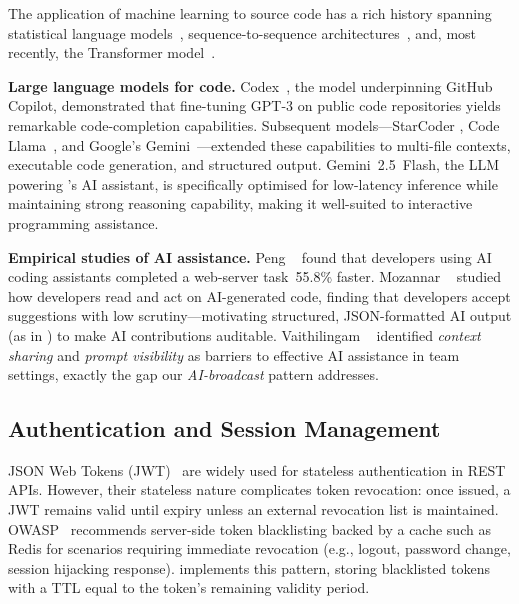 The application of machine learning to source code has a rich history spanning
statistical language models~\cite{hindle2012naturalness}, sequence-to-sequence
architectures~\cite{bahdanau2015neural}, and, most recently, the Transformer
model~\cite{vaswani2017attention}.

\textbf{Large language models for code.}
Codex~\cite{chen2021evaluating}, the model underpinning GitHub Copilot,
demonstrated that fine-tuning GPT-3 on public code repositories yields
remarkable code-completion capabilities. Subsequent models---StarCoder
\cite{li2023starcoder}, Code Llama~\cite{roziere2023codellama}, and Google's
Gemini~\cite{team2023gemini}---extended these capabilities to multi-file
contexts, executable code generation, and structured output. Gemini~2.5~Flash,
the LLM powering \echoray{}'s AI assistant, is specifically optimised for
low-latency inference while maintaining strong reasoning capability, making it
well-suited to interactive programming assistance.

\textbf{Empirical studies of AI assistance.}
Peng \etal~\cite{peng2023impact} found that developers using AI coding
assistants completed a web-server task~55.8\% faster. Mozannar
\etal~\cite{mozannar2024reading} studied how developers read and act on
AI-generated code, finding that developers accept suggestions with low
scrutiny---motivating structured, JSON-formatted AI output (as in \echoray{})
to make AI contributions auditable. Vaithilingam \etal~\cite{vaithilingam2022expectation}
identified \emph{context sharing} and \emph{prompt visibility} as barriers to
effective AI assistance in team settings, exactly the gap our
\emph{AI-broadcast} pattern addresses.

\subsection{Authentication and Session Management}

JSON Web Tokens (JWT)~\cite{jones2015rfc7519} are widely used for stateless
authentication in REST APIs. However, their stateless nature complicates token
revocation: once issued, a JWT remains valid until expiry unless an external
revocation list is maintained. OWASP~\cite{owasp2024jwt} recommends
server-side token blacklisting backed by a cache such as Redis for scenarios
requiring immediate revocation (e.g., logout, password change, session
hijacking response). \echoray{} implements this pattern, storing blacklisted
tokens with a TTL equal to the token's remaining validity period.

